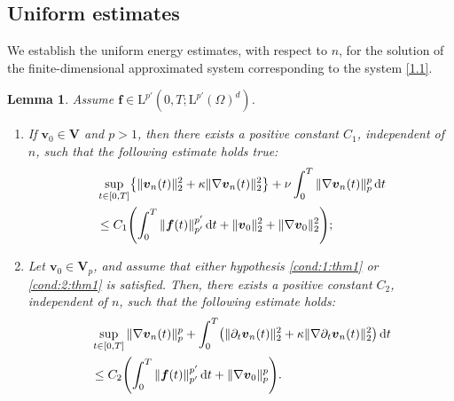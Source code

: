 \documentclass[12pt,reqno]{amsart}
\numberwithin{equation}{section}
\newtheorem{lemma}[theorem]{Lemma}
\let\originalleft\left
\let\originalright\right
\renewcommand{\left}{\mathopen{}\mathclose\bgroup\originalleft}
\renewcommand{\right}{\aftergroup\egroup\originalright}
\theoremstyle{definition}
\def\1{\Omega}
\def\dt{\,\mathrm{d}t}
\def\L{\mathrm{L}}
\def\vv{\boldsymbol{v}}
\def\f{\boldsymbol{f}}
\def\bfV{\mathbf{V}}
\begin{document}
		\subsection{Uniform estimates}\label{uestimate}
We establish the uniform energy estimates, with respect to $n$, for the solution of the finite-dimensional approximated system corresponding to the system \eqref{1.1}.
		\begin{lemma}\label{thrmUE:p}
Assume $\f\in\L^{p'}(0,T;\L^{p'}(\1)^d)$.
\begin{enumerate}
  \item If $\vv_0\in\bfV$ and $p>1$, then there exists a positive constant $C_1$, independent of $n$, such that the following estimate holds true:
\begin{equation}\label{ae1:un:p}
\begin{split}
 &
\sup_{t\in[0,T]}\left\{\|\vv_n(t)\|^2_{2} + \kappa\|\nabla\vv_n(t)\|_{2}^2\right\} + \nu\int_0^T\|\nabla\vv_n(t)\|^p_{p}\dt
 \\
& \leq C_1\left(\int_0^T\|\f(t)\|^{p'}_{p'}\dt + \|\vv_0\|^2_{2} + \|\nabla\vv_0\|_{2}^2 \right);
\end{split}
\end{equation}
  \item Let $\vv_0 \in \bfV_p$, and assume that either hypothesis \eqref{cond:1:thm1} or \eqref{cond:2:thm1} is satisfied. Then, there exists a positive constant $C_2$, independent of $n$, such that the following estimate holds:
\begin{equation}\label{ae2:un':p}
\begin{split}
 &
 \sup_{t\in[0,T]}\|\nabla\vv_n(t)\|^p_{p} +
\int_0^T\left(\|{\partial_t\vv_{n}}(t)\|_{2}^2+\kappa\|\nabla{\partial_t\vv_{n}}(t)\|^2_{2}\right)\dt
\\
&
 \leq
 C_2\left(\int_0^T\|\f(t)\|^{p'}_{p'}\dt + \|\nabla\vv_0\|^p_{p} \right).
\end{split}
\end{equation}
\end{enumerate}
	\end{lemma}
\end{document}
